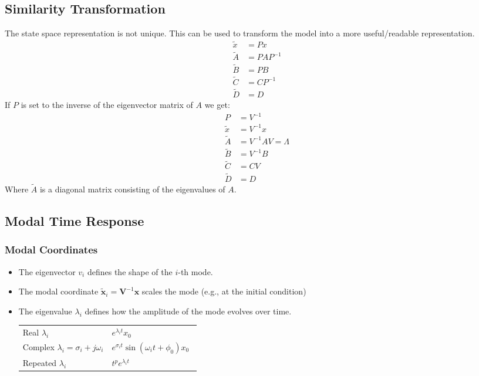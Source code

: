 \subsection{Similarity Transformation}
The state space representation is not unique. This can be used to transform the model into a more \flqq{}useful/readable\frqq{} representation.
\begin{align*}
    \tilde{x} & = Px       \\
    \tilde{A} & = PAP^{-1} \\
    \tilde{B} & = PB       \\
    \tilde{C} & = CP^{-1}  \\
    \tilde{D} & = D
\end{align*}
If $P$ is set to the inverse of the eigenvector matrix of $A$ we get:
\begin{align*}
    P         & = V^{-1}             \\
    \tilde{x} & = V^{-1}x            \\
    \tilde{A} & = V^{-1}AV = \Lambda \\
    \tilde{B} & = V^{-1}B            \\
    \tilde{C} & = CV                 \\
    \tilde{D} & = D
\end{align*}
Where $\tilde{A}$ is a diagonal matrix consisting of the eigenvalues of $A$.

\subsection{Modal Time Response}
\subsubsection{Modal Coordinates}
\begin{itemize}
    \item The eigenvector $v_i$ defines the shape of the $i$-th mode.
    \item The modal coordinate $\tilde{\mathbf{x}}_i=\mathbf{V}^{-1}\mathbf{x}$ scales the mode (e.g., at the initial condition)
    \item The eigenvalue $\lambda_i$ defines how the amplitude of the mode evolves over time.

          \begin{tabularx}{\linewidth}{@{}p{0.5\linewidth}X@{}}
              \quad Real $\lambda_i$                            & \textrightarrow{} $e^{\lambda_i t}x_0$                         \\
              \quad Complex $\lambda_i = \sigma_i + j \omega_i$ & \textrightarrow{} $e^{\sigma_i t}\sin(\omega_i t + \phi_0)x_0$ \\
              \quad Repeated $\lambda_i$                        & \textrightarrow{} $t^p e^{\lambda_i t}$
          \end{tabularx}
\end{itemize}

